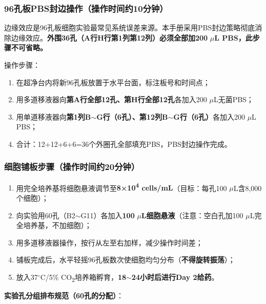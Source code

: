 \documentclass[12pt,a4paper]{article}
\newcommand{\degC}{$^\circ$C}
\newcommand{\uul}{\,$\mu$L}
\begin{document}
\subsubsection{96孔板PBS封边操作（操作时间约10分钟）}

\begin{warningbox}[title={⚠\ PBS封边——绝对不可省略}]
边缘效应是96孔板细胞实验最常见系统误差来源。本手册采用PBS封边策略彻底消除边缘效应。\textbf{外围36孔（A行H行第1列第12列）必须全部加200\,\uul{} PBS，此步骤不可省略。}
\end{warningbox}

操作步骤：
\begin{enumerate}
\item 在超净台内将新96孔板放置于水平台面，标注板号和时间点；
\item 用多道移液器向\textbf{第A行全部12孔、第H行全部12孔}各加入200\,\uul{}无菌PBS；
\item 用单道移液器向\textbf{第1列B$\sim$G行（6孔）、第12列B$\sim$G行（6孔）}各加入200\,\uul{} PBS；
\item 合计：12+12+6+6=36个外圈孔全部填充PBS，PBS封边操作完成。
\end{enumerate}

\subsubsection{细胞铺板步骤（操作时间约20分钟）}

\begin{enumerate}
\item 用完全培养基将细胞悬液调节至\textbf{8×10\textsuperscript{4} cells/mL}（目标：每孔100\,\uul{}含8,000个细胞）；
\item 向实验用60孔（B2$\sim$G11）各加入\textbf{100\,\uul{}细胞悬液}（注意：空白孔加100\,\uul{}完全培养基，不加细胞）；
\item 用多道移液器操作，按行从左至右加样，减少操作时间差；
\item 铺板完成后，水平轻摇96孔板数次使细胞均匀分布（\textbf{不得旋转振荡}）；
\item 放入37\degC{}/5\% CO\textsubscript{2}培养箱孵育，\textbf{18$\sim$24小时后进行Day 2给药}。
\end{enumerate}

\textbf{实验孔分组排布规范（60孔的分配）}：
\end{document}
